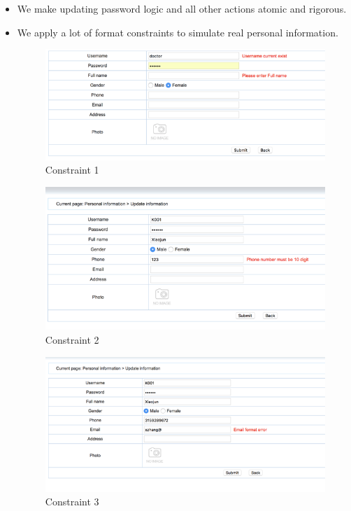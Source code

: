 \begin{itemize}
    \item We make updating password logic and all other actions atomic and rigorous. 
    \item We apply a lot of format constraints to simulate real personal information.
        \begin{figure}[H]
    \centering
    \includegraphics[width=\textwidth]{fp/s5.png}
    \caption{Constraint 1}
    \label{fig:sp5}
\end{figure}
\begin{figure}[H]
    \centering
    \includegraphics[width=\textwidth]{fp/s6.png}
    \caption{Constraint 2}
    \label{fig:sp6}
\end{figure}
\begin{figure}[H]
    \centering
    \includegraphics[width=\textwidth]{fp/s7.png}
    \caption{Constraint 3}
    \label{fig:sp7}
\end{figure}
\end{itemize}

